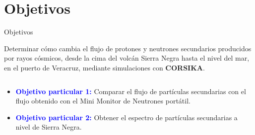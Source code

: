     \section{Objetivos}
    \begin{frame}{Objetivos} %
        \justifying %
        
        \vspace*{-1.5cm} %
    
        \begin{tcolorbox}[colback=custombgcolor3, coltext=customfgcolor2,
                      colframe=custombgcolor3, %
                      width=\textwidth,       %
                      arc=8pt,                %
                      boxrule=0pt,            %
                      top=1mm, bottom=1mm,    %
                      enlarge bottom by=3mm   %
                      ]
            Determinar cómo cambia el flujo de protones y neutrones secundarios producidos por rayos cósmicos, desde la cima del volcán Sierra Negra hasta el nivel del mar, en el puerto de Veracruz, mediante simulaciones con \textbf{CORSIKA}.
        \end{tcolorbox}

        \begin{columns}
            \begin{column}{1.0\textwidth} %
                \begin{itemize}
                    \item \textcolor{blue}{\textbf{Objetivo particular 1:}} Comparar el flujo de partículas secundarias con el flujo obtenido con el Mini Monitor de Neutrones portátil. 
                    \item \textcolor{blue}{\textbf{Objetivo particular 2:}} Obtener el espectro de partículas secundarias a nivel de Sierra Negra.
                \end{itemize}
            \end{column}
        \end{columns}         
    \end{frame} 


